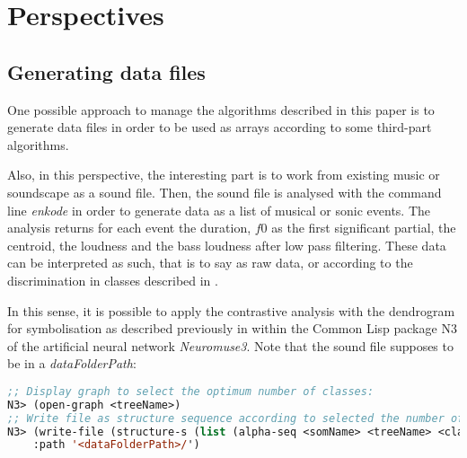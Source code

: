 \newpage
\section{Perspectives}
\label{Perspective}

\subsection{Generating data files}
\label{gdf}

One possible approach to manage the algorithms described in this paper is to generate data files in order to be used as arrays according to some third-part algorithms. 

Also, in this perspective, the interesting part is to work from existing music or soundscape as a sound file. Then, the sound file is analysed with the command line \textsl{enkode} in order to generate data as a list of musical or sonic events. The analysis returns for each event the duration, $f0$ as the first significant partial, the centroid, the loudness and the bass loudness after low pass filtering. These data can be interpreted as such, that is to say as raw data, or according to the discrimination in classes described in . 

\smallskip

In this sense, it is possible to apply the contrastive analysis with the dendrogram for symbolisation as described previously in  within the Common Lisp package N3 of the artificial neural network \textsl{Neuromuse3}.
Note that the sound file supposes to be in a \textsl{dataFolderPath}:

\smallskip

 \begin{lstlisting}[basicstyle=\footnotesize\ttfamily,language=Lisp]
;; Display graph to select the optimum number of classes:
N3> (open-graph <treeName>)
;; Write file as structure sequence according to selected the number of classes:
N3> (write-file (structure-s (list (alpha-seq <somName> <treeName> <classesNumber>)) :result :last) :name '<fileName>.dat' 
    :path '<dataFolderPath>/')
\end{lstlisting}

